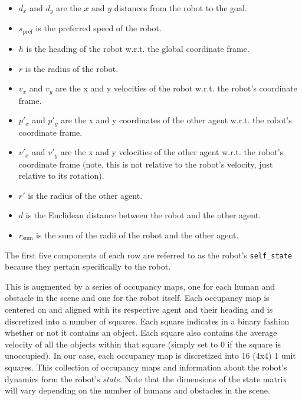 \documentclass[letterpaper, 10 pt, conference]{ieeeconf}  %
\begin{document}
	\begin{itemize}
		\item $d_x$ and $d_y$ are the $x$ and $y$ distances from the robot to the goal.
		\item $s_\text{pref}$ is the preferred speed of the robot.
		\item $h$ is the heading of the robot w.r.t. the global coordinate frame.
		\item $r$ is the radius of the robot.
		\item $v_x$ and $v_y$ are the x and y velocities of the robot w.r.t. the robot's coordinate frame.
		\item $p'_x$ and $p'_y$ are the x and y coordinates of the other agent w.r.t. the robot's coordinate frame.
		\item $v'_x$ and $v'_y$ are the x and y velocities of the other agent w.r.t. the robot's coordinate frame (note, this is not relative to the robot's velocity, just relative to its rotation).
		\item $r'$ is the radius of the other agent.
		\item $d$ is the Euclidean distance between the robot and the other agent.
		\item $r_\text{sum}$ is the sum of the radii of the robot and the other agent.
	\end{itemize}

	The first five components of each row are referred to as the robot's \verb|self_state| because they pertain specifically to the robot.
	
	This is augmented by a series of occupancy maps, one for each human and obstacle in the scene and one for the robot itself. Each occupancy map is centered on and aligned with its respective agent and their heading and is discretized into a number of squares. Each square indicates in a binary fashion whether or not it contains an object. Each square also contains the average velocity of all the objects within that square (simply set to 0 if the square is unoccupied). In our case, each occupancy map is discretized into 16 (4x4) 1 unit squares. This collection of occupancy maps and information about the robot's dynamics form the robot's \textit{state}. Note that the dimensions of the state matrix will vary depending on the number of humans and obstacles in the scene.
	
\end{document}
